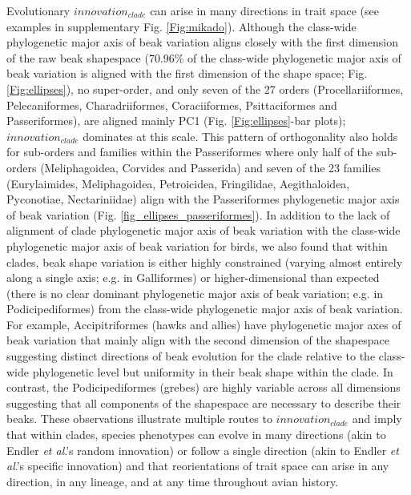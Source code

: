 \documentclass[12pt,letterpaper]{article}
\begin{document}
Evolutionary $innovation_{clade}$ can arise in many directions in trait space (see examples in supplementary Fig. \ref{Fig:mikado}). %
Although the class-wide phylogenetic major axis of beak variation aligns closely with the first dimension of the raw beak shapespace (70.96\% of the class-wide phylogenetic major axis of beak variation is aligned with the first dimension of the shape space; Fig. \ref{Fig:ellipses}), no super-order, and only seven of the 27 orders (Procellariiformes, Pelecaniformes, Charadriiformes, Coraciiformes, Psittaciformes and Passeriformes), are aligned mainly PC1 (Fig. \ref{Fig:ellipses}-bar plots); $innovation_{clade}$ dominates at this scale.
This pattern of orthogonality also holds for sub-orders and families within the Passeriformes where only half of the sub-orders (Meliphagoidea, Corvides and Passerida) and seven of the 23 families (Eurylaimides, Meliphagoidea, Petroicidea, Fringilidae, Aegithaloidea, Pyconotiae, Nectariniidae) align with the Passeriformes phylogenetic major axis of beak variation (Fig.
\ref{fig_ellipses_passeriformes}).
In addition to the lack of alignment of clade phylogenetic major axis of beak variation with the class-wide phylogenetic major axis of beak variation for birds, we also found that within clades, beak shape variation is either highly constrained (varying almost entirely along a single axis; e.g. in Galliformes) or higher-dimensional than expected (there is no clear dominant phylogenetic major axis of beak variation; e.g. in Podicipediformes) from the class-wide phylogenetic major axis of beak variation.
For example, Accipitriformes (hawks and allies) have phylogenetic major axes of beak variation that mainly align with the second dimension of the shapespace suggesting distinct directions of beak evolution for the clade relative to the class-wide phylogenetic level but uniformity in their beak shape within the clade.
In contrast, the Podicipediformes (grebes) are highly variable across all dimensions suggesting that all components of the shapespace are necessary to describe their beaks.
These observations illustrate multiple routes to $innovation_{clade}$ and imply that within clades, species phenotypes can evolve in many directions (akin to Endler \textit{et al}.'s \cite{endler2005animal} random innovation) or follow a single direction (akin to Endler \textit{et al}.'s \cite{endler2005animal} specific innovation) and that reorientations of trait space can arise in any direction, in any lineage, and at any time throughout avian history.
\end{document}
